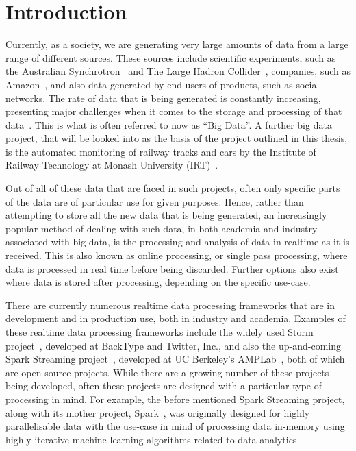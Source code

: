 \section{Introduction}
\label{sec:intro}

Currently, as a society, we are generating very large amounts of data from a large range of different sources. These
sources include scientific experiments, such as the Australian Synchrotron~\cite{web:synchrotron} and The Large Hadron
Collider~\cite{web:LHC}, companies, such as Amazon~\cite{web:Amazon}, and also data generated by end users of products,
such as social networks. The rate of data that is being generated is constantly increasing, presenting major challenges
when it comes to the storage and processing of that data~\cite{bohlouli_towards_2013}. This is what is often referred to
now as ``Big Data''. A further big data project, that will be looked into as the basis of the project outlined in this
thesis, is the automated monitoring of railway tracks and cars by the Institute of Railway Technology at Monash University
(IRT)~\cite{web:monash_irt}.

Out of all of these data that are faced in such projects, often only specific parts of the data are of particular use for given
purposes. Hence, rather than attempting to store all the new data that is being generated, an increasingly popular method of
dealing with such data, in both academia and industry associated with big data, is the processing and analysis of
data in realtime as it is received. This is also known as online processing, or single pass processing, where data is
processed in real time before being discarded. Further options also exist where data is stored after processing, depending
on the specific use-case.

There are currently numerous realtime data processing frameworks that are in development and in production use, both in
industry and academia. Examples of these realtime data processing frameworks include the widely used Storm
project~\cite{web:Storm}, developed at BackType and Twitter, Inc., and also the up-and-coming Spark Streaming
project~\cite{web:SparkStreaming}, developed at UC Berkeley's AMPLab~\cite{web:UCBerkelyAMCLab}, both of which are
open-source projects. While there are a growing number of these projects being developed, often these projects are designed
with a particular type of processing in mind. For example, the before
mentioned Spark Streaming project, along with its mother project, Spark~\cite{web:Spark}, was originally designed for highly
parallelisable data with the use-case in mind of processing data in-memory using highly iterative machine learning
algorithms related to data analytics~\cite{liu_survey_2014}.

